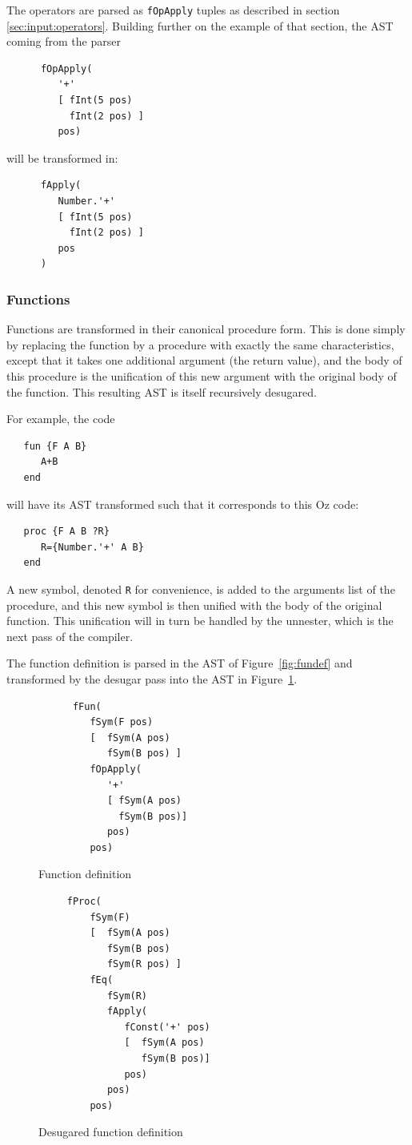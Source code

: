 \documentclass[a4paper]{memoir}
\begin{document}
The operators are parsed as \lstinline!fOpApply! tuples as described in section \ref{sec:input:operators}. Building further on the example of that section, the AST coming from the parser

\begin{verbatim}
      fOpApply(
         '+'
         [ fInt(5 pos)
           fInt(2 pos) ]
         pos)
\end{verbatim}
will be transformed in:
\begin{verbatim}
      fApply(
         Number.'+'
         [ fInt(5 pos)
           fInt(2 pos) ]
         pos
      )
\end{verbatim}

\subsubsection{Functions}\label{sec:arch:desugar:functions}
Functions are transformed in their canonical procedure form. This is done simply by replacing the function by a procedure with exactly the same characteristics, except that it takes one additional argument (the return value), and the body of this procedure is the unification of this new argument with the original body of the function. This resulting AST is itself recursively desugared.

For example, the code
\begin{lstlisting}
   fun {F A B}
      A+B
   end

\end{lstlisting} 
will have its AST transformed such that it corresponds to this Oz code:
\begin{lstlisting}
   proc {F A B ?R}
      R={Number.'+' A B}
   end
\end{lstlisting} 
A new symbol, denoted \lstinline!R! for convenience, is added to the arguments list of the procedure, and this new symbol is then unified with the body of the original function. This unification will in turn be handled by the unnester, which is the next pass of the compiler.


The function definition is parsed in the AST of Figure~\ref{fig:fundef} 
and transformed by the desugar pass into the AST in Figure~\ref{fig:fundesugar}.
\begin{figure}[h]
\begin{verbatim}
      fFun(
         fSym(F pos)
         [  fSym(A pos)
            fSym(B pos) ]
         fOpApply(
            '+'
            [ fSym(A pos)
              fSym(B pos)]
            pos)
         pos)
\end{verbatim}
\caption{Function definition}
\label{fig:fundef}
\begin{verbatim}
     fProc(     
         fSym(F)
         [  fSym(A pos)
            fSym(B pos)
            fSym(R pos) ]
         fEq(
            fSym(R)
            fApply(
               fConst('+' pos)
               [  fSym(A pos)
                  fSym(B pos)]
               pos)
            pos)
         pos)
\end{verbatim}
\caption{Desugared function definition}
\label{fig:fundesugar}
\end{figure}
\end{document}
